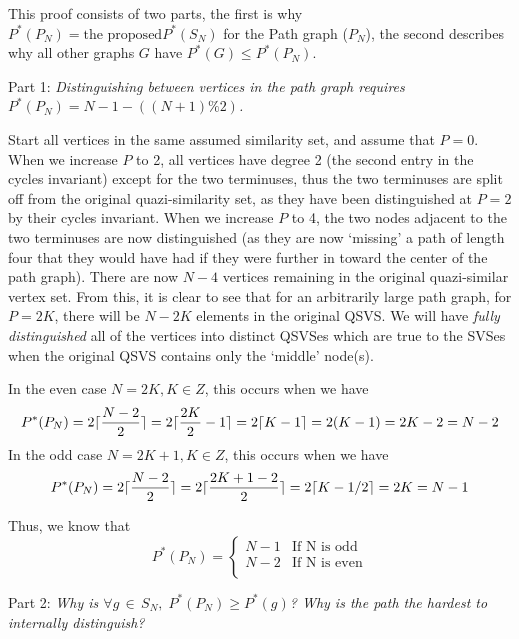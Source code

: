 This proof consists of two parts, the first is why $P^*(P_N) = \text{the proposed} P^*(S_N)$ for the Path graph ($P_N$), the second describes why all other graphs $G$ have $P^*(G) \leq P^*(P_N)$.

Part 1: \emph{Distinguishing between vertices in the path graph requires $P^*(P_N) = N - 1 - ((N+1)\%2)$.}

Start all vertices in the same assumed similarity set, and assume that $P = 0$.
When we increase $P$ to 2, all vertices have degree 2 (the second entry in the cycles invariant) except for the two terminuses, thus the two terminuses are split off from the original quazi-similarity set, as they have been distinguished at $P=2$ by their cycles invariant.
When we increase $P$ to 4, the two nodes adjacent to the two terminuses are now distinguished (as they are now `missing' a path of length four that they would have had if they were further in toward the center of the path graph). 
There are now $N-4$ vertices remaining in the original quazi-similar vertex set.
From this, it is clear to see that for an arbitrarily large path graph, for $P=2K$, there will be $N-2K$ elements in the original QSVS.
We will have \emph{fully distinguished} all of the vertices into distinct QSVSes which are true to the SVSes when the original QSVS contains only the `middle' node(s).

In the even case $N = 2K, K \in Z$, this occurs when we have 
$$P^*(P_N) = 2\lceil\frac{N-2}{2}\rceil = 2\lceil\frac{2K}{2} - 1\rceil = 2\lceil K - 1\rceil = 2(K - 1) = 2K - 2 = N - 2$$
In the odd case $N = 2K +1, K \in Z$, this occurs when we have 
$$P^*(P_N) = 2\lceil\frac{N-2}{2}\rceil  = 2\lceil\frac{2K+1- 2}{2}\rceil = 2\lceil K - 1/2\rceil = 2K = N - 1 $$

Thus, we know that 
\[ P^*(P_N) = \begin{cases} 
      N-1 & \text{If N is odd} \\
      N-2 & \text{If N is even} \\
   \end{cases}
\]

Part 2: \emph{Why is $\forall g \,\in\, S_{N} , \;P^*(P_N) \geq P^*(g)$? Why is the path the hardest to internally distinguish?}

